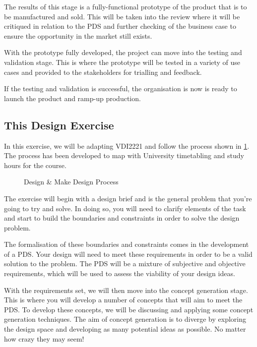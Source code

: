 The results of this stage is a fully-functional prototype of the product that is to be manufactured and sold. This will be taken into the review where it will be critiqued in relation to the PDS and further checking of the business case to ensure the opportunity in the market still exists.

With the prototype fully developed, the project can move into the testing and validation stage. This is where the prototype will be tested in a variety of use cases and provided to the stakeholders for trialling and feedback.

If the testing and validation is successful, the organisation is now is ready to launch the product and ramp-up production.

\subsection{This Design Exercise}

In this exercise, we will be adapting \ac{VDI2221} and follow the process shown in \cref{fig-dm-process}.
The process has been developed to map with University timetabling and study hours for the course.

\begin{figure}[h!]
    \centering
    
    \caption{Design \& Make Design Process}\label{fig-dm-process}
\end{figure}

The exercise will begin with a design brief and is the general problem that you're going to try and solve. In doing so, you will need to clarify elements of the task and start to build the boundaries and constraints in order to solve the design problem.

The formalisation of these boundaries and constraints comes in the development of a \acf{PDS}. Your design will need to meet these requirements in order to be a valid solution to the problem. The PDS will be a mixture of subjective and objective requirements, which will be used to assess the viability of your design ideas. 

With the requirements set, we will then move into the concept generation stage. This is where you will develop a number of concepts that will aim to meet the PDS. To develop these concepts, we will be discussing and applying some concept generation techniques. The aim of concept generation is to diverge by exploring the design space and developing as many potential ideas as possible. No matter how crazy they may seem!

